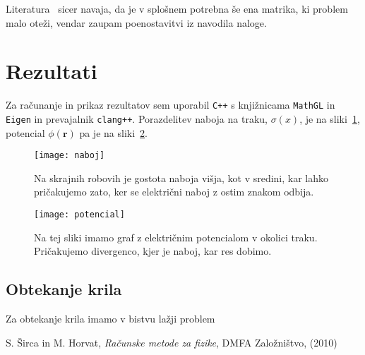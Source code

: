 \documentclass[a4 paper, 12pt]{article}
\renewcommand{\r}{
	\ensuremath{\mathbf{r}}
}
\begin{document}
Literatura~\cite[str.~659]{sirca} sicer navaja, da je v splo\v snem potrebna \v se ena matrika, ki problem malo
ote\v zi, vendar zaupam poenostavitvi iz navodila naloge.
\section{Rezultati}

Za ra\v cunanje in prikaz rezultatov sem uporabil {\tt C++} s knji\v znicama {\tt MathGL} in {\tt Eigen} in
prevajalnik {\tt clang++}. Porazdelitev naboja na traku, $\sigma(x)$, je na sliki~\ref{gr1}, potencial $\phi(\r)$ pa je
na sliki~\ref{gr2}.

\begin{figure}[H]\centering
	\texttt{[image: naboj]}
	\caption{Na skrajnih robovih je gostota naboja vi\v sja, kot v sredini, kar lahko
		pri\v cakujemo zato, ker se elektri\v cni naboj z ostim znakom odbija.}
	\label{gr1}
\end{figure}

\begin{figure}[H]\centering
	\texttt{[image: potencial]}
	\caption{Na tej sliki imamo graf z elektri\v cnim potencialom v okolici traku. Pri\v cakujemo
		divergenco, kjer je naboj, kar res dobimo.}
	\label{gr2}
\end{figure}

\subsection{Obtekanje krila}

Za obtekanje krila imamo v bistvu la\v zji problem

\begin{thebibliography}{9}
		S. \v Sirca in M. Horvat,
		{\em Ra\v cunske metode za fizike},
		DMFA Zalo\v zni\v stvo,
		(2010)
\end{thebibliography}
\end{document}
